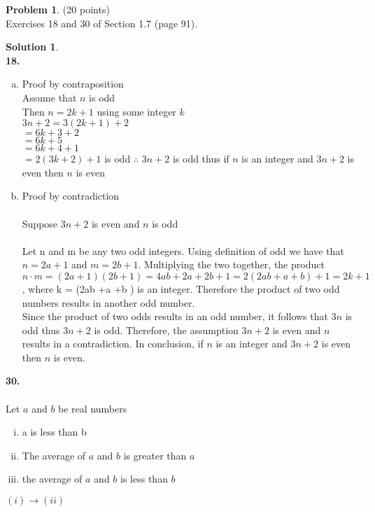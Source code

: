 \documentclass{article}
\theoremstyle{definition}
\newtheorem{problem}{Problem}
\newtheorem*{solution}{Solution}
\begin{document}
\newpage

\begin{problem} (20 points)\\
Exercises 18 and 30 of Section 1.7 (page 91).
\end{problem}

\begin{solution}\ \\
\textbf{18.}
\begin{enumerate}[a)]
\item Proof by contraposition \\
      Assume that $n$ is odd \\
      Then $n = 2k +1$ using some integer $k$ \\
      $3n+2=3(2k+1)+2$ \\
      $=6k + 3 + 2$ \\
      $=6k + 5$ \\
      $=6k + 4 + 1 $ \\
      $= 2(3k+2) +1$ is odd $\therefore$ $3n+2$ is odd thus if $n$ is an integer and $3n+2$ is even then $n$ is even

\item Proof by contradiction \\ \ \\
      Suppose $3n+2$ is even and $n$ is odd \\ \ \\
      Let n and m be any two odd integers. Using definition of odd we have that $n = 2a + 1$ and $m = 2b + 1$.
      Multiplying the two together, the product $n \cdot m = (2a + 1)(2b +1) = 4ab + 2a + 2b +1=2( 2ab + a + b) + 1 =
      2k + 1$, where k = (2ab +a +b ) is an integer. Therefore the product of two odd numbers results in another odd
      number. \\
      Since the product of two odds results in an odd number, it follows that $3n$ is odd thus $3n+2$ is odd.
      Therefore, the assumption $3n+2$ is even and $n$ results in a contradiction. In conclusion, if $n$ is an
      integer and $3n+2$ is even then $n$ is even.
\end{enumerate}
\textbf{30.} \\ \ \\
Let $a$ and $b$ be real numbers
\begin{enumerate}[(i)]
\item a is less than b
\item The average of $a$ and $b$ is greater than $a$
\item the average of $a$ and $b$ is less than $b$
\end{enumerate}
$(i) \rightarrow (ii)$



\end{solution}
\end{document}
